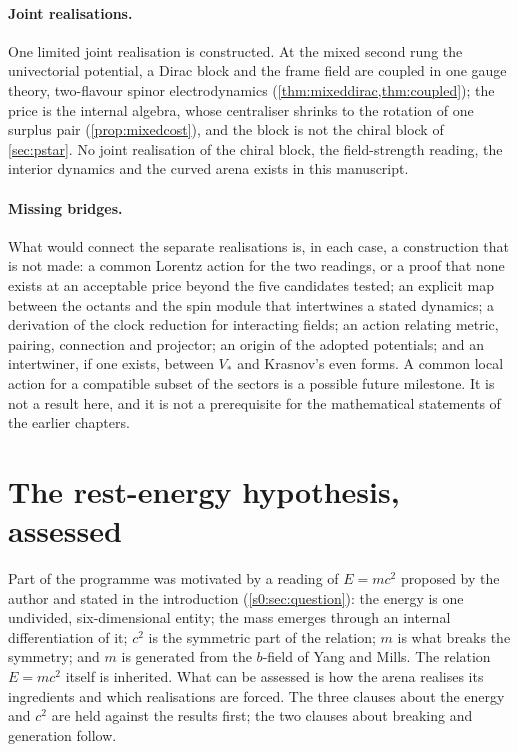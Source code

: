 \paragraph{Joint realisations.} One limited joint realisation is constructed. At the mixed second rung the univectorial potential, a Dirac
block and the frame field are coupled in one gauge theory, two-flavour spinor electrodynamics (\cref{thm:mixeddirac,thm:coupled}); the price is
the internal algebra, whose centraliser shrinks to the rotation of one surplus pair (\cref{prop:mixedcost}), and the block is not the chiral
block of \cref{sec:pstar}. No joint realisation of the chiral block, the field-strength reading, the interior dynamics and the curved arena
exists in this manuscript.

\paragraph{Missing bridges.} What would connect the separate realisations is, in each case, a construction that is not made:
a common Lorentz action for the two readings, or a proof that none exists at an acceptable price beyond the five candidates tested; an explicit map between the octants and the spin module that intertwines a stated dynamics; a derivation of the clock reduction
for interacting fields; an action relating metric, pairing, connection and projector; an origin of the adopted potentials; and an
intertwiner, if one exists, between $V_*$ and Krasnov's even forms. A common local action for a compatible subset of the sectors is a
possible future milestone. It is not a result here, and it is not a prerequisite for the mathematical statements of the earlier chapters.

\section{The rest-energy hypothesis, assessed}
\label{sec:resynthesis}
\label{s5:sec:synthesis}

Part of the programme was motivated by a reading of $E=mc^2$ proposed by the author and stated in the introduction
(\cref{s0:sec:question}): the energy is one undivided, six-dimensional entity; the mass emerges through an internal differentiation of it;
$c^2$ is the symmetric part of the relation; $m$ is what breaks the symmetry; and $m$ is generated from the $b$-field of Yang and Mills. The
relation $E=mc^2$ itself is inherited. What can be assessed is how the arena realises its ingredients and which realisations are forced. The
three clauses about the energy and $c^2$ are held against the results first; the two clauses about breaking and generation follow.
\label{sec:w:whatthearenasaysaboutemc}
\label{sec:energy-readings}


